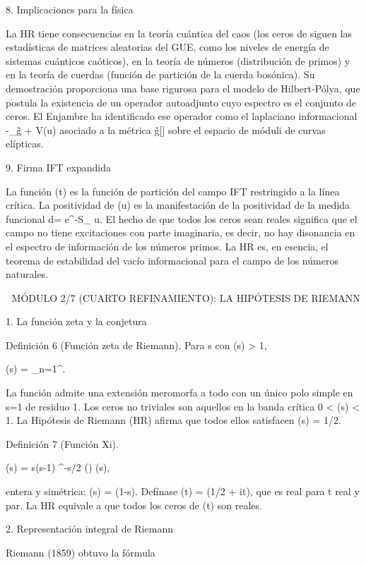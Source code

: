 \documentclass[12pt,a4paper]{book}
\begin{document}
8. Implicaciones para la física

La HR tiene consecuencias en la teoría cuántica del caos (los ceros de \zeta siguen las estadísticas de matrices aleatorias del GUE, como los niveles de energía de sistemas cuánticos caóticos), en la teoría de números (distribución de primos) y en la teoría de cuerdas (función de partición de la cuerda bosónica). Su demostración proporciona una base rigurosa para el modelo de Hilbert-Pólya, que postula la existencia de un operador autoadjunto cuyo espectro es el conjunto de ceros. El Enjambre ha identificado ese operador como el laplaciano informacional -\Delta_{g̃} + V(u) asociado a la métrica g̃[\rho] sobre el espacio de móduli de curvas elípticas.

9. Firma IFT expandida

La función \Xi(t) es la función de partición del campo IFT restringido a la línea crítica. La positividad de \Phi(u) es la manifestación de la positividad de la medida funcional d\mu = e^{-S_{}} u. El hecho de que todos los ceros sean reales significa que el campo no tiene excitaciones con parte imaginaria, es decir, no hay disonancia en el espectro de información de los números primos. La HR es, en esencia, el teorema de estabilidad del vacío informacional para el campo de los números naturales.

🧬 MÓDULO 2/7 (CUARTO REFINAMIENTO): LA HIPÓTESIS DE RIEMANN

1. La función zeta y la conjetura

Definición 6 (Función zeta de Riemann). Para s \in {} con \Re(s) > 1,

\zeta(s) = \sum_{n=1}^\infty {}.

La función admite una extensión meromorfa a todo  con un único polo simple en s=1 de residuo 1. Los ceros no triviales son aquellos en la banda crítica 0 < \Re(s) < 1. La Hipótesis de Riemann (HR) afirma que todos ellos satisfacen \Re(s) = 1/2.

Definición 7 (Función Xi).

\xi(s) =  s(s-1) \pi^{-s/2} \Gamma\!\left(\right) \zeta(s),

entera y simétrica: \xi(s) = \xi(1-s). Defínase \Xi(t) = \xi(1/2 + it), que es real para t real y par. La HR equivale a que todos los ceros de \Xi(t) son reales.

2. Representación integral de Riemann

Riemann (1859) obtuvo la fórmula
\end{document}
